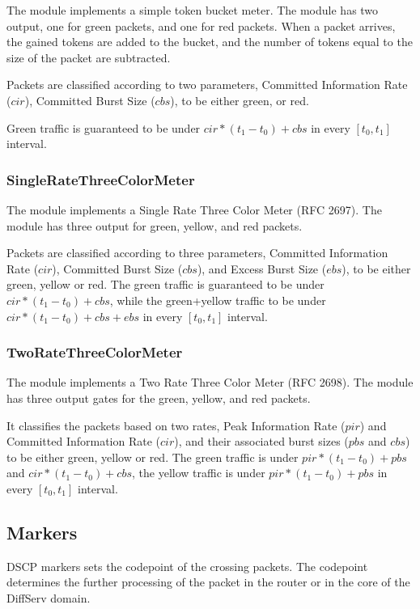 The  module implements a simple token bucket meter.
The module has two output, one for green packets, and one for red packets.
When a packet arrives, the gained tokens are added to the bucket, and
the number of tokens equal to the size of the packet are subtracted.

Packets are classified according to two parameters,
Committed Information Rate ($cir$), Committed Burst Size ($cbs$),
to be either green, or red.

Green traffic is guaranteed to be under $cir*(t_1-t_0)+cbs$ in
every $[t_0,t_1]$ interval.

\subsubsection*{SingleRateThreeColorMeter}

The  module implements a
Single Rate Three Color Meter (RFC 2697).
The module has three output for green, yellow, and red packets.

Packets are classified according to three parameters,
Committed Information Rate ($cir$), Committed Burst Size ($cbs$),
and Excess Burst Size ($ebs$), to be either green, yellow or red.
The green traffic is guaranteed to be under $cir*(t_1-t_0)+cbs$,
while the green+yellow traffic to be under $cir*(t_1-t_0)+cbs+ebs$
in every $[t_0,t_1]$ interval.


\subsubsection*{TwoRateThreeColorMeter}

The  module implements a
Two Rate Three Color Meter (RFC 2698). The module has three output
gates for the green, yellow, and red packets.

It classifies the packets based on two rates, Peak Information Rate ($pir$)
and Committed Information Rate ($cir$), and their associated burst sizes
($pbs$ and $cbs$) to be either green, yellow or red. The green traffic
is under $pir*(t_1-t_0)+pbs$ and $cir*(t_1-t_0)+cbs$, the yellow traffic
is under $pir*(t_1-t_0)+pbs$ in every $[t_0,t_1]$ interval.

\subsection{Markers}

DSCP markers sets the codepoint of the crossing packets.
The codepoint determines the further processing of the packet
in the router or in the core of the DiffServ domain.

